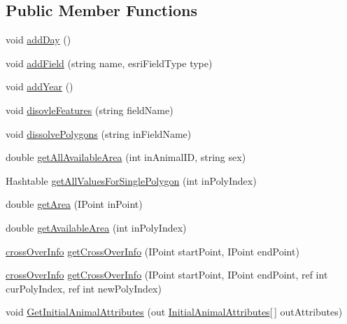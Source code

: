 \subsection*{Public Member Functions}
\begin{DoxyCompactItemize}
\item 
void \hyperlink{class_p_a_z___dispersal_1_1_map_a3bc956377ad1c8a5ccbc12f237bb3c59}{add\-Day} ()
\item 
void \hyperlink{class_p_a_z___dispersal_1_1_map_a22fd7097da918e30e1a7a0d7c9a92d90}{add\-Field} (string name, esri\-Field\-Type type)
\item 
void \hyperlink{class_p_a_z___dispersal_1_1_map_ae38c89cf8c1dd0da79c1262cbafc2b19}{add\-Year} ()
\item 
void \hyperlink{class_p_a_z___dispersal_1_1_map_afdd11c1878b0b61e572f15c4b27793e3}{disovle\-Features} (string field\-Name)
\item 
void \hyperlink{class_p_a_z___dispersal_1_1_map_ae25239a60792f8282793e3ab972903ec}{dissolve\-Polygons} (string in\-Field\-Name)
\item 
double \hyperlink{class_p_a_z___dispersal_1_1_map_a2a14288d1470adf97260ddd79197415a}{get\-All\-Available\-Area} (int in\-Animal\-I\-D, string sex)
\item 
Hashtable \hyperlink{class_p_a_z___dispersal_1_1_map_a7dc64e0e2c01a4de21694fedc6422b2a}{get\-All\-Values\-For\-Single\-Polygon} (int in\-Poly\-Index)
\item 
double \hyperlink{class_p_a_z___dispersal_1_1_map_acb42f32be27101de1be0a41e055c6a0c}{get\-Area} (I\-Point in\-Point)
\item 
double \hyperlink{class_p_a_z___dispersal_1_1_map_ad68b5d8b0ff0c735c5acbc0eb1eb222d}{get\-Available\-Area} (int in\-Poly\-Index)
\item 
\hyperlink{class_p_a_z___dispersal_1_1cross_over_info}{cross\-Over\-Info} \hyperlink{class_p_a_z___dispersal_1_1_map_ad8061e53d1af2ab9deb85f9ba3a6d547}{get\-Cross\-Over\-Info} (I\-Point start\-Point, I\-Point end\-Point)
\item 
\hyperlink{class_p_a_z___dispersal_1_1cross_over_info}{cross\-Over\-Info} \hyperlink{class_p_a_z___dispersal_1_1_map_abc9c9c6feb01401b6a7e1537ea1a9452}{get\-Cross\-Over\-Info} (I\-Point start\-Point, I\-Point end\-Point, ref int cur\-Poly\-Index, ref int new\-Poly\-Index)
\item 
void \hyperlink{class_p_a_z___dispersal_1_1_map_a742da9ca6aa4c66d2d23f3897907aa9b}{Get\-Initial\-Animal\-Attributes} (out \hyperlink{class_p_a_z___dispersal_1_1_initial_animal_attributes}{Initial\-Animal\-Attributes}\mbox{[}$\,$\mbox{]} out\-Attributes)

\end{DoxyCompactItemize}
